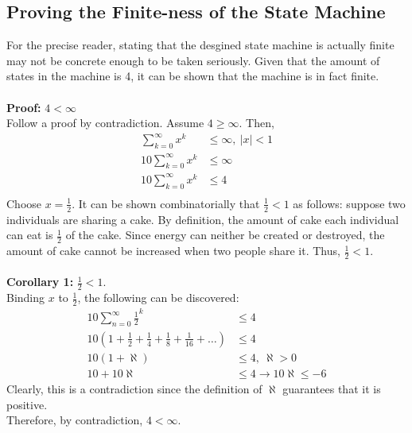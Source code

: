 \documentclass[12pt]{report}
\begin{document}
\begin{appendix}
	\chapter{Proving the Finite-ness of the State Machine}
	For the precise reader, stating that the desgined state machine is actually finite may not be
	concrete enough to be taken seriously. Given that the amount of states in the machine is 4, it
	can be shown that the machine is in fact finite.\\\\
	\textbf{Proof:} $4 < \infty$\\
	\label{a:proof}
	Follow a proof by contradiction.
	Assume $4 \geq \infty$. Then, 
	\begin{equation*}
		\begin{aligned}
			\sum_{k=0}^{\infty}x^k &\leq \infty, \ |x| < 1\\
			10\sum_{k=0}^{\infty}x^k &\leq \infty\\
			10\sum_{k=0}^{\infty}x^k &\leq 4\\
		\end{aligned}
	\end{equation*}
	Choose $x = \frac{1}{2}$. It can be shown combinatorially that $\frac{1}{2} < 1$ as follows:
	suppose two individuals are sharing a cake. By definition, the amount of cake each individual
	can eat is $\frac{1}{2}$ of the cake. Since energy can neither be created or destroyed, the
	amount of cake cannot be increased when two people share it. Thus, $\frac{1}{2} < 1$.\\\\
	\textbf{Corollary 1:} $\frac{1}{2} < 1$. \\
	Binding $x$ to $\frac{1}{2}$, the following can be discovered:
	\begin{equation*}
		\begin{aligned}
			10\sum_{n=0}^{\infty}\frac{1}{2}^k &\leq 4\\
			10\left(1 + \frac{1}{2} +\frac{1}{4} + \frac{1}{8} + \frac{1}{16} + \dots\right) &\leq 4\\
			10\left(1 + \aleph\right) &\leq 4, \ \aleph > 0\\
			10 + 10\aleph &\leq 4 \rightarrow 10\aleph \leq -6
		\end{aligned}
	\end{equation*}
	Clearly, this is a contradiction since the definition of $\aleph$ guarantees that it is
	positive.\\
	Therefore, by contradiction, $4 < \infty$.

\end{appendix}
\end{document}
